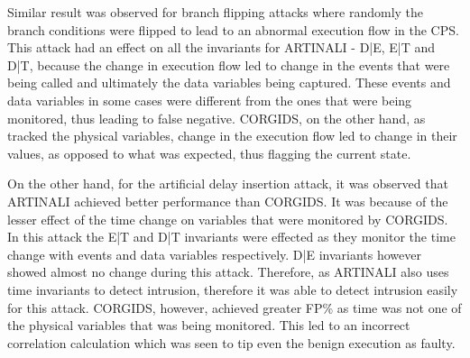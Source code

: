 Similar result was observed for branch flipping attacks where randomly the branch conditions were flipped to lead to an abnormal execution flow in the CPS. This attack had an effect on all the invariants for ARTINALI -  D|E, E|T and D|T, because the change in execution flow led to change in the events that were being called and ultimately the data variables being captured. These events and data variables in some cases were different from the ones that were being monitored, thus leading to false negative. CORGIDS, on the other hand, as tracked the physical variables, change in the execution flow led to change in their values, as opposed to what was expected, thus flagging the current state.

On the other hand, for the artificial delay insertion attack, it was observed that ARTINALI achieved better performance than CORGIDS. It was because of the lesser effect of the time change on variables that were monitored by CORGIDS. In this attack the E|T and D|T invariants were effected as they monitor the time change with events and data variables respectively. D|E invariants however showed almost no change during this attack. Therefore, as ARTINALI also uses time invariants to detect intrusion, therefore it was able to detect intrusion easily for this attack. CORGIDS, however, achieved greater FP\% as time was not one of the physical variables that was being monitored. This led to an incorrect correlation calculation which was seen to tip even the benign execution as faulty.



\endinput
